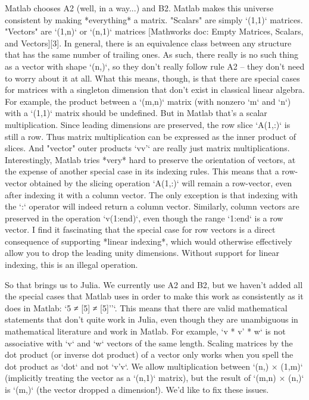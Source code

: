 Matlab chooses A2 (well, in a way...) and B2. Matlab makes this universe
consistent by making *everything* a matrix. "Scalars" are simply `(1,1)`
matrices. "Vectors" are `(1,n)` or `(n,1)` matrices [Mathworks doc: Empty
Matrices, Scalars, and Vectors][3]. In general, there is an equivalence class
between any structure that has the same number of trailing ones. As such, there
really is no such thing as a vector with shape `(n,)`, so they don't really
follow rule A2 -- they don't need to worry about it at all. What this means,
though, is that there are special cases for matrices with a singleton dimension
that don't exist in classical linear algebra. For example, the product between
a `(m,n)` matrix (with nonzero `m` and `n`) with a `(1,1)` matrix should be
undefined. But in Matlab that's a scalar multiplication. Since leading
dimensions are preserved, the row slice `A(1,:)` is still a row. Thus matrix
multiplication can be expressed as the inner product of slices. And "vector"
outer products `vv'` are really just matrix multiplications. Interestingly,
Matlab tries *very* hard to preserve the orientation of vectors, at the expense
of another special case in its indexing rules. This means that a row-vector
obtained by the slicing operation `A(1,:)` will remain a row-vector, even after
indexing it with a column vector. The only exception is that indexing with the
`:` operator will indeed return a column vector. Similarly, column vectors are
preserved in the operation `v(1:end)`, even though the range `1:end` is a row
vector. I find it fascinating that the special case for row vectors is a direct
consequence of supporting *linear indexing*, which would otherwise effectively
allow you to drop the leading unity dimensions. Without support for linear
indexing, this is an illegal operation.

So that brings us to Julia. We currently use A2 and B2, but we haven't added
all the special cases that Matlab uses in order to make this work as
consistently as it does in Matlab: `5 ≠ [5] ≠ [5]''`. This means that there are
valid mathematical statements that don't quite work in Julia, even though they
are unambiguous in mathematical literature and work in Matlab. For example,
`v * v' * w` is not associative with `v` and `w` vectors of the same length.
Scaling matrices by the dot product (or inverse dot product) of a vector only
works when you spell the dot product as `dot` and not `v'v`. We allow
multiplication between `(n,) × (1,m)` (implicitly treating the vector as a
`(n,1)` matrix), but the result of `(m,n) × (n,)` is `(m,)` (the vector dropped
a dimension!). We'd like to fix these issues.

